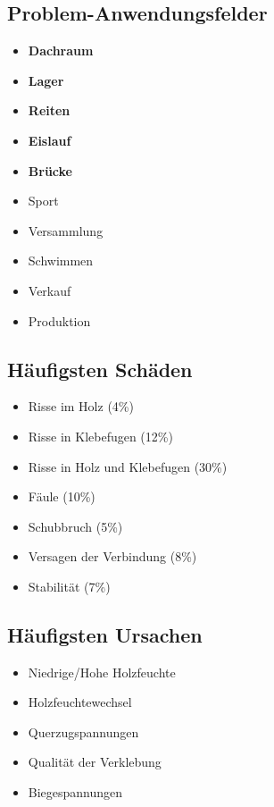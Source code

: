 \documentclass[fleqn,twoside]{article}
\begin{document}
    \subsection{Problem-Anwendungsfelder}
        \begin{itemize}
            \item \textbf{Dachraum}
            \item \textbf{Lager}
            \item \textbf{Reiten}
            \item \textbf{Eislauf}
            \item \textbf{Brücke}
            \item Sport
            \item Versammlung
            \item Schwimmen
            \item Verkauf
            \item Produktion
        \end{itemize}

    \subsection{Häufigsten Schäden}
        \begin{itemize}
            \item Risse im Holz (4\%)
            \item Risse in Klebefugen (12\%)
            \item Risse in Holz und Klebefugen (30\%)
            \item Fäule (10\%)
            \item Schubbruch (5\%)
            \item Versagen der Verbindung (8\%)
            \item Stabilität (7\%)
        \end{itemize}

    \subsection{Häufigsten Ursachen}
        \begin{itemize}
            \item Niedrige/Hohe Holzfeuchte
            \item Holzfeuchtewechsel
            \item Querzugspannungen
            \item Qualität der Verklebung
            \item Biegespannungen
        \end{itemize}
\end{document}
